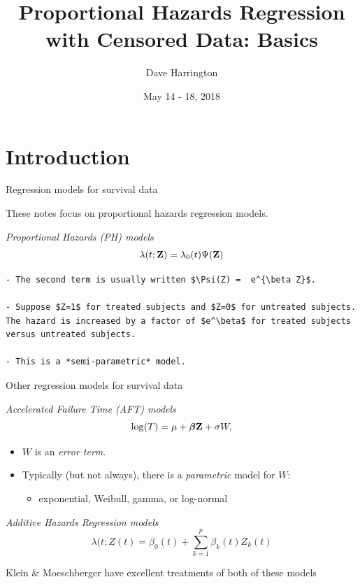 \documentclass[ignorenonframetext,]{beamer}
\title{Proportional Hazards Regression with Censored Data: Basics}
\author{Dave Harrington}
\date{May 14 - 18, 2018}
\providecommand{\tightlist}{%
  \setlength{\itemsep}{0pt}\setlength{\parskip}{0pt}}
\newcommand{\bbeta}{\mbox{\boldmath$\beta$}}
\begin{document}
\frame{\titlepage}

\begin{frame}
\tableofcontents[hideallsubsections]
\end{frame}
\hypertarget{introduction}{%
\section{Introduction}\label{introduction}}

\begin{frame}[fragile]{%
\protect\hypertarget{regression-models-for-survival-data}{%
Regression models for survival data}}

These notes focus on proportional hazards regression models.

\emph{Proportional Hazards (PH) models}\\
\[   \lambda(t;{\bf Z}) = \lambda_0(t) \Psi({\bf Z}) \]

\begin{verbatim}
- The second term is usually written $\Psi(Z) =  e^{\beta Z}$.

- Suppose $Z=1$ for treated subjects and $Z=0$ for untreated subjects.  The hazard is increased by a factor of $e^\beta$ for treated subjects versus untreated subjects.
     
- This is a *semi-parametric* model.
\end{verbatim}

\end{frame}

\begin{frame}{%
\protect\hypertarget{other-regression-models-for-survival-data}{%
Other regression models for survival data}}

\emph{Accelerated Failure Time (AFT) models}\\
\[  \log(T) = \mu + {\bbeta} {\bf Z} +  \sigma W,\]

\begin{itemize}
\item
  \(W\) is an \emph{error term}.
\item
  Typically (but not always), there is a \emph{parametric} model for
  \(W\):

  \begin{itemize}
  \tightlist
  \item
    exponential, Weibull, gamma, or log-normal
  \end{itemize}
\end{itemize}

\emph{Additive Hazards Regression models} \[
   \lambda(t; Z(t) = \beta_0(t) + \sum_{k=1}^p \beta_k(t) Z_k(t)
\]

Klein \& Moeschberger have excellent treatments of both of these models

\end{frame}
\end{document}
